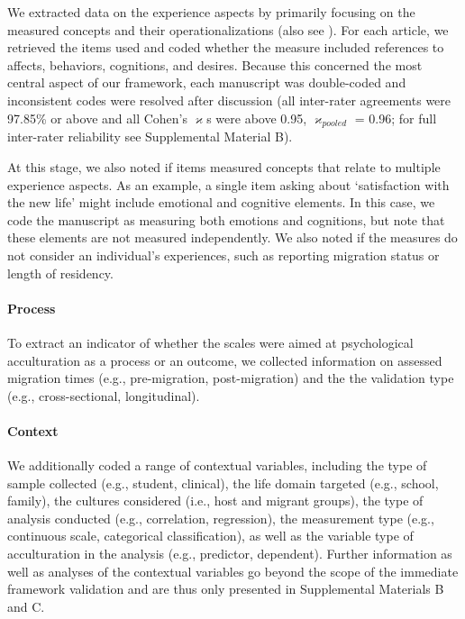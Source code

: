 We extracted data on the experience aspects by primarily focusing on the
measured concepts and their operationalizations (also see
). For each article, we retrieved the items
used and coded whether the measure included references to affects,
behaviors, cognitions, and desires. Because this concerned the most
central aspect of our framework, each manuscript was double-coded and
inconsistent codes were resolved after discussion (all inter-rater
agreements were 97.85\% or above and all Cohen's \(\varkappa\)s were
above 0.95, \(\varkappa_{pooled}\) = 0.96; for full inter-rater
reliability see Supplemental Material B).

At this stage, we also noted if items measured concepts that relate to
multiple experience aspects. As an example, a single item asking about
`satisfaction with the new life' might include emotional and cognitive
elements. In this case, we code the manuscript as measuring both
emotions and cognitions, but note that these elements are not measured
independently. We also noted if the measures do not consider an
individual's experiences, such as reporting migration status or length
of residency.

\paragraph{Process}

To extract an indicator of whether the scales were aimed at
psychological acculturation as a process or an outcome, we collected
information on assessed migration times (e.g., pre-migration,
post-migration) and the the validation type (e.g., cross-sectional,
longitudinal).

\paragraph{Context}

We additionally coded a range of contextual variables, including the
type of sample collected (e.g., student, clinical), the life domain
targeted (e.g., school, family), the cultures considered (i.e., host and
migrant groups), the type of analysis conducted (e.g., correlation,
regression), the measurement type (e.g., continuous scale, categorical
classification), as well as the variable type of acculturation in the
analysis (e.g., predictor, dependent). Further information as well as
analyses of the contextual variables go beyond the scope of the
immediate framework validation and are thus only presented in
Supplemental Materials B and C.

